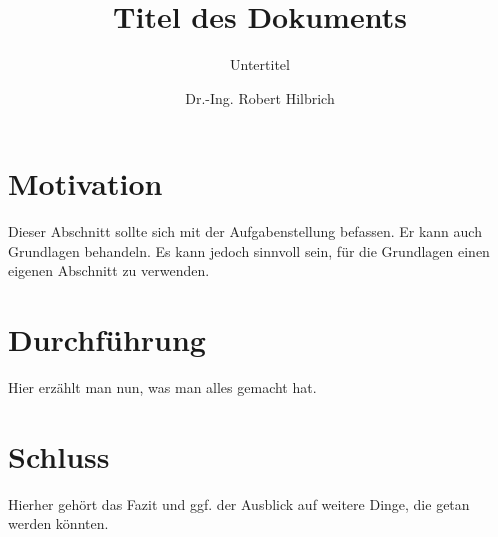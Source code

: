 \documentclass{scrartcl}
\begin{document}
\title{Titel des Dokuments}%
\subtitle{Untertitel}%
\author{Dr.-Ing. Robert Hilbrich}%
\date{}%
\maketitle%

\section{Motivation}
\label{sec:motivation}
Dieser Abschnitt sollte sich mit der Aufgabenstellung befassen. Er kann auch
Grundlagen behandeln. Es kann jedoch sinnvoll sein, für die Grundlagen einen
eigenen Abschnitt zu verwenden.

\section{Durchführung}
\label{sec:durchfuehrung}
Hier erzählt man nun, was man alles gemacht hat.

\section{Schluss}
\label{sec:schluss}
Hierher gehört das Fazit und ggf. der Ausblick auf weitere Dinge, die getan
werden könnten.
\end{document}
